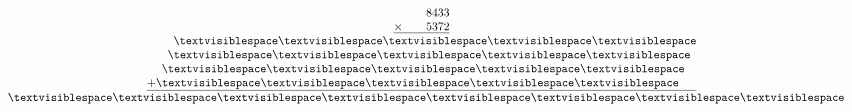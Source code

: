 \begin{minipage}[t]{0.3\linewidth}
\begin{align*}\begin{array}{c}
\phantom{
\times0000
}
8433\\
\underline{
\times
\phantom{
0000
}
5372
}\\
\phantom{
+000
}
\textvisiblespace
\textvisiblespace
\textvisiblespace
\textvisiblespace
\textvisiblespace
\\
\phantom{
+00
}
\textvisiblespace
\textvisiblespace
\textvisiblespace
\textvisiblespace
\textvisiblespace
\phantom0\\
\phantom{
+0
}
\textvisiblespace
\textvisiblespace
\textvisiblespace
\textvisiblespace
\textvisiblespace
\phantom0\phantom0\\
\underline{
+
\textvisiblespace
\textvisiblespace
\textvisiblespace
\textvisiblespace
\textvisiblespace
\phantom0\phantom0\phantom0
}
\\
\phantom{+}
\textvisiblespace
\textvisiblespace
\textvisiblespace
\textvisiblespace
\textvisiblespace
\textvisiblespace
\textvisiblespace
\textvisiblespace
\end{array}\end{align*}
\end{minipage}
\begin{minipage}[t]{0.05\linewidth}
\begin{align*}\begin{array}{c}
\textvisiblespace
\\
\textvisiblespace
\\
\textvisiblespace
\\
\textvisiblespace
\\
\textvisiblespace
\\
\textvisiblespace
\\
\textvisiblespace
\end{array}\end{align*}
\end{minipage}
\begin{minipage}[t]{0.05\linewidth}
\begin{align*}\begin{array}{c}
\textvisiblespace
\\
\textvisiblespace
\\
\textvisiblespace
\\
\textvisiblespace
\end{array}\end{align*}
\end{minipage}
